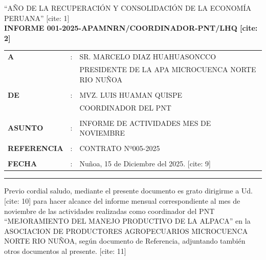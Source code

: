 \documentclass[11pt,a4paper]{article}
\begin{document}
\begin{center}
    \small\MakeUppercase{“Año de la recuperación y consolidación de la economía peruana”} [cite: 1] \\
    \vspace{0.8cm}
    \Large\bfseries INFORME 001-2025-APAMNRN/COORDINADOR-PNT/LHQ [cite: 2]
\end{center}

\vspace{0.6cm}

\begin{tabular}{@{}llp{11cm}@{}}
    \bfseries A & : & SR. MARCELO DIAZ HUAHUASONCCO \\ [cite: 3]
                &   & PRESIDENTE DE LA APA MICROCUENCA NORTE RIO NUÑOA \\ [cite: 4] \vspace{0.15cm} \\
    \bfseries DE & : & MVZ. LUIS HUAMAN QUISPE \\
                 &   & COORDINADOR DEL PNT \\ [cite: 6] \vspace{0.15cm} \\
    \bfseries ASUNTO & : & INFORME DE ACTIVIDADES MES DE NOVIEMBRE \\ [cite: 7] \vspace{0.15cm} \\
    \bfseries REFERENCIA & : & CONTRATO Nº005-2025 \\ [cite: 8] \vspace{0.15cm} \\
    \bfseries FECHA & : & Nuñoa, 15 de Diciembre del 2025. [cite: 9]
\end{tabular}

\vspace{0.3cm}
\noindent\rule{\textwidth}{1pt} %
\vspace{0.4cm}

Previo cordial saludo, mediante el presente documento es grato dirigirme a Ud. [cite: 10] para hacer alcance del informe mensual correspondiente al mes de noviembre de las actividades realizadas como coordinador del PNT “MEJORAMIENTO DEL MANEJO PRODUCTIVO DE LA ALPACA” en la ASOCIACION DE PRODUCTORES AGROPECUARIOS MICROCUENCA NORTE RIO NUÑOA, según documento de Referencia, adjuntando también otros documentos al presente. [cite: 11]

\vspace{0.2cm}
\end{document}

